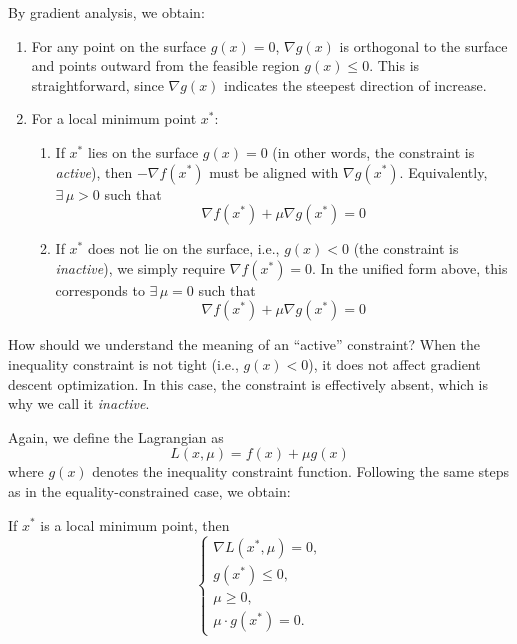 \documentclass[../main]{subfiles}
\begin{document}
By gradient analysis, we obtain:
\begin{enumerate}
    \item For any point on the surface $g(x)=0$, $\nabla g(x)$ is orthogonal to the surface and points outward from the feasible region $g(x)\leq 0$.  
    This is straightforward, since $\nabla g(x)$ indicates the steepest direction of increase.
    \item For a local minimum point $x^*$:
    \begin{enumerate}
        \item If $x^*$ lies on the surface $g(x)=0$ (in other words, the constraint is \emph{active}), then $-\nabla f(x^*)$ must be aligned with $\nabla g(x^*)$.  
        Equivalently, $\exists \,\mu > 0$ such that 
        \[
            \nabla f(x^*) + \mu \nabla g(x^*) = 0
        \]
        \item If $x^*$ does not lie on the surface, i.e., $g(x)<0$ (the constraint is \emph{inactive}), we simply require $\nabla f(x^*)=0$.  
        In the unified form above, this corresponds to $\exists \,\mu=0$ such that 
        \[
            \nabla f(x^*) + \mu \nabla g(x^*) = 0
        \]
    \end{enumerate}
\end{enumerate}

\begin{note}
    How should we understand the meaning of an ``active'' constraint?  
    When the inequality constraint is not tight (i.e., $g(x)<0$), it does not affect gradient descent optimization.  
    In this case, the constraint is effectively absent, which is why we call it \emph{inactive}.
\end{note}
Again, we define the Lagrangian as
\begin{equation}
    L(x, \mu) = f(x) + \mu g(x)
\end{equation}
where $g(x)$ denotes the inequality constraint function.  
Following the same steps as in the equality-constrained case, we obtain:

\begin{theorem}
    If $x^*$ is a local minimum point, then
    \begin{equation}
        \begin{cases}
            \nabla L(x^*, \mu) = 0, \\
            g(x^*) \leq 0, \\
            \mu \geq 0, \\
            \mu \cdot g(x^*) = 0.
        \end{cases}
    \end{equation}
\end{theorem}
\end{document}
